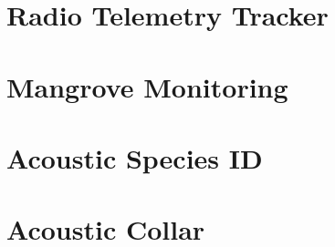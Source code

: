 \section{Radio Telemetry Tracker}

\section{Mangrove Monitoring}

\section{Acoustic Species ID}

\section{Acoustic Collar}

